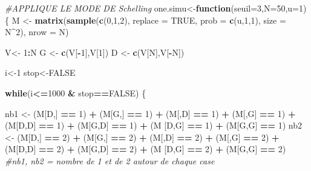 \documentclass[
]{article}
\newenvironment{Shaded}{\begin{snugshade}}{\end{snugshade}}
\newcommand{\CommentTok}[1]{\textcolor[rgb]{0.56,0.35,0.01}{\textit{#1}}}
\newcommand{\ControlFlowTok}[1]{\textcolor[rgb]{0.13,0.29,0.53}{\textbf{#1}}}
\newcommand{\DataTypeTok}[1]{\textcolor[rgb]{0.13,0.29,0.53}{#1}}
\newcommand{\DecValTok}[1]{\textcolor[rgb]{0.00,0.00,0.81}{#1}}
\newcommand{\KeywordTok}[1]{\textcolor[rgb]{0.13,0.29,0.53}{\textbf{#1}}}
\newcommand{\NormalTok}[1]{#1}
\newcommand{\OperatorTok}[1]{\textcolor[rgb]{0.81,0.36,0.00}{\textbf{#1}}}
\newcommand{\OtherTok}[1]{\textcolor[rgb]{0.56,0.35,0.01}{#1}}
\newcommand{\StringTok}[1]{\textcolor[rgb]{0.31,0.60,0.02}{#1}}
\begin{document}
\begin{Shaded}
\begin{Highlighting}[]
\CommentTok{#APPLIQUE LE MODE DE Schelling}
\NormalTok{one.simu<-}\ControlFlowTok{function}\NormalTok{(}\DataTypeTok{seuil=}\DecValTok{3}\NormalTok{,}\DataTypeTok{N=}\DecValTok{50}\NormalTok{,}\DataTypeTok{u=}\DecValTok{1}\NormalTok{)\{}
\NormalTok{M <-}\StringTok{ }\KeywordTok{matrix}\NormalTok{(}\KeywordTok{sample}\NormalTok{(}\KeywordTok{c}\NormalTok{(}\DecValTok{0}\NormalTok{,}\DecValTok{1}\NormalTok{,}\DecValTok{2}\NormalTok{), }\DataTypeTok{replace =} \OtherTok{TRUE}\NormalTok{, }\DataTypeTok{prob =} \KeywordTok{c}\NormalTok{(u,}\DecValTok{1}\NormalTok{,}\DecValTok{1}\NormalTok{), }\DataTypeTok{size =}\NormalTok{ N}\OperatorTok{^}\DecValTok{2}\NormalTok{), }\DataTypeTok{nrow =}\NormalTok{ N)}

\NormalTok{V<-}\StringTok{ }\DecValTok{1}\OperatorTok{:}\NormalTok{N}
\NormalTok{G <-}\StringTok{ }\KeywordTok{c}\NormalTok{(V[}\OperatorTok{-}\DecValTok{1}\NormalTok{],V[}\DecValTok{1}\NormalTok{])}
\NormalTok{D <-}\StringTok{ }\KeywordTok{c}\NormalTok{(V[N],V[}\OperatorTok{-}\NormalTok{N])}

\NormalTok{i<-}\DecValTok{1}
\NormalTok{stop<-}\OtherTok{FALSE}

\ControlFlowTok{while}\NormalTok{(i}\OperatorTok{<=}\DecValTok{1000} \OperatorTok{&}\StringTok{ }\NormalTok{stop}\OperatorTok{==}\OtherTok{FALSE}\NormalTok{)}
\NormalTok{\{}

\NormalTok{nb1 <-}\StringTok{ }\NormalTok{(M[D,] }\OperatorTok{==}\StringTok{ }\DecValTok{1}\NormalTok{) }\OperatorTok{+}\StringTok{ }\NormalTok{(M[G,] }\OperatorTok{==}\StringTok{ }\DecValTok{1}\NormalTok{) }\OperatorTok{+}\StringTok{ }\NormalTok{(M[,D] }\OperatorTok{==}\StringTok{ }\DecValTok{1}\NormalTok{) }\OperatorTok{+}\StringTok{ }\NormalTok{(M[,G] }\OperatorTok{==}\StringTok{ }\DecValTok{1}\NormalTok{) }\OperatorTok{+}\StringTok{ }\NormalTok{(M[D,D] }\OperatorTok{==}\StringTok{ }\DecValTok{1}\NormalTok{) }\OperatorTok{+}\StringTok{ }\NormalTok{(M[G,D] }\OperatorTok{==}\StringTok{ }\DecValTok{1}\NormalTok{) }\OperatorTok{+}\StringTok{ }\NormalTok{(M [D,G] }\OperatorTok{==}\StringTok{ }\DecValTok{1}\NormalTok{) }\OperatorTok{+}\StringTok{ }\NormalTok{(M[G,G] }\OperatorTok{==}\StringTok{ }\DecValTok{1}\NormalTok{)}
\NormalTok{nb2 <-}\StringTok{ }\NormalTok{(M[D,] }\OperatorTok{==}\StringTok{ }\DecValTok{2}\NormalTok{) }\OperatorTok{+}\StringTok{ }\NormalTok{(M[G,] }\OperatorTok{==}\StringTok{ }\DecValTok{2}\NormalTok{) }\OperatorTok{+}\StringTok{ }\NormalTok{(M[,D] }\OperatorTok{==}\StringTok{ }\DecValTok{2}\NormalTok{) }\OperatorTok{+}\StringTok{ }\NormalTok{(M[,G] }\OperatorTok{==}\StringTok{ }\DecValTok{2}\NormalTok{) }\OperatorTok{+}\StringTok{ }\NormalTok{(M[D,D] }\OperatorTok{==}\StringTok{ }\DecValTok{2}\NormalTok{) }\OperatorTok{+}\StringTok{ }\NormalTok{(M[G,D] }\OperatorTok{==}\StringTok{ }\DecValTok{2}\NormalTok{) }\OperatorTok{+}\StringTok{ }\NormalTok{(M [D,G] }\OperatorTok{==}\StringTok{ }\DecValTok{2}\NormalTok{) }\OperatorTok{+}\StringTok{ }\NormalTok{(M[G,G] }\OperatorTok{==}\StringTok{ }\DecValTok{2}\NormalTok{)}
\CommentTok{#nb1, nb2 = nombre de 1 et de 2 autour de chaque case}


\end{Highlighting}
\end{Shaded}
\end{document}
